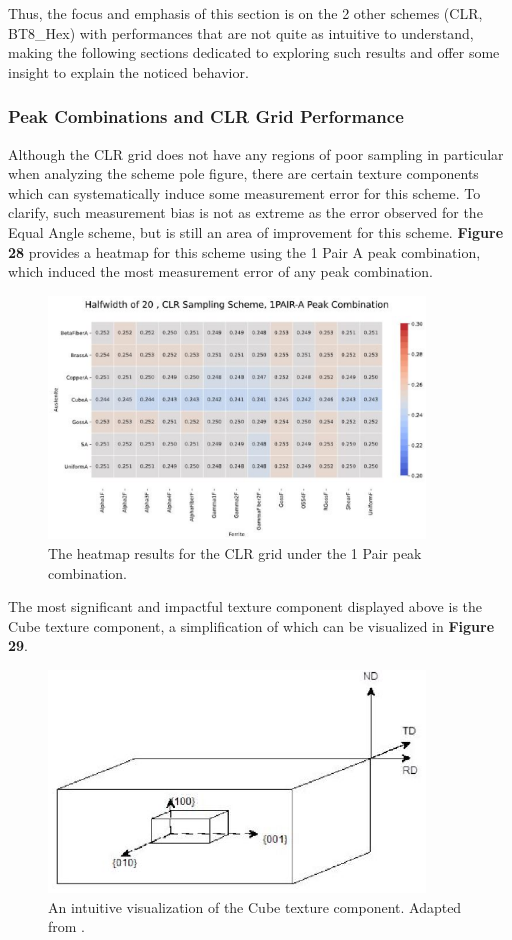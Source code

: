 \documentclass[10pt]{article}
\begin{document}
Thus, the focus and 
emphasis of this section is on the 2 other schemes (CLR, BT8\_Hex) with performances that are not quite as intuitive to understand, making the following sections 
dedicated to exploring such results and offer some insight to explain the noticed behavior.

\subsubsection{Peak Combinations and CLR Grid Performance}
Although the CLR grid does not have any regions of poor sampling in particular when analyzing the scheme pole figure, there are certain 
texture components which can systematically induce some measurement error for this scheme. To clarify, such measurement bias is not as extreme 
as the error observed for the Equal Angle scheme, but is still an area of improvement for this scheme. \textbf{Figure 28} provides a heatmap for this scheme using
the 1 Pair A peak combination, which induced the most measurement error of any peak combination.
\begin{figure}[h]
    \centering
    \includegraphics[width=10cm]{fig28}
    \caption{\label{tab1}The heatmap results for the CLR grid under the 1 Pair peak combination.} 
    \end{figure}

The most significant and impactful texture component displayed above is the Cube texture component, a simplification of which can be visualized in \textbf{Figure 29}.
\begin{figure}[h]
    \centering
    \includegraphics[width=10cm]{fig29}
    \caption{\label{tab1}An intuitive visualization of the Cube texture component. Adapted from \cite{ref08}. } 
    \end{figure}
\end{document}
